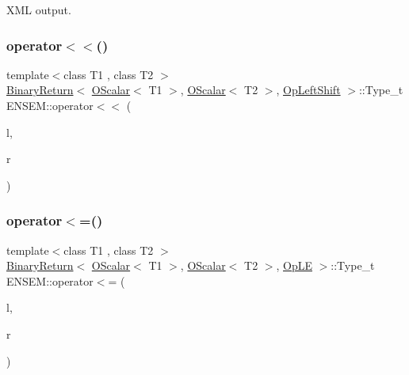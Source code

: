 X\+ML output. 

\mbox{\label{group__obsscalar_ga4e9caae1c3f8de5f5a7066462fdbd391}} 
\subsubsection{\texorpdfstring{operator$<$$<$()}{operator<<()}\hspace{0.1cm}{\footnotesize\ttfamily [4/4]}}
{\footnotesize\ttfamily template$<$class T1 , class T2 $>$ \\
\mbox{\hyperlink{structENSEM_1_1BinaryReturn}{Binary\+Return}}$<$ \mbox{\hyperlink{classENSEM_1_1OScalar}{O\+Scalar}}$<$ T1 $>$, \mbox{\hyperlink{classENSEM_1_1OScalar}{O\+Scalar}}$<$ T2 $>$, \mbox{\hyperlink{structENSEM_1_1OpLeftShift}{Op\+Left\+Shift}} $>$\+::Type\+\_\+t E\+N\+S\+E\+M\+::operator$<$$<$ (\begin{DoxyParamCaption}\item[{const \mbox{\hyperlink{classENSEM_1_1OScalar}{O\+Scalar}}$<$ T1 $>$ \&}]{l,  }\item[{const \mbox{\hyperlink{classENSEM_1_1OScalar}{O\+Scalar}}$<$ T2 $>$ \&}]{r }\end{DoxyParamCaption})\hspace{0.3cm}{\ttfamily [inline]}}

\mbox{\label{group__obsscalar_gaf2d22d4258136c38dba73b6d210b7048}} 
\subsubsection{\texorpdfstring{operator$<$=()}{operator<=()}}
{\footnotesize\ttfamily template$<$class T1 , class T2 $>$ \\
\mbox{\hyperlink{structENSEM_1_1BinaryReturn}{Binary\+Return}}$<$ \mbox{\hyperlink{classENSEM_1_1OScalar}{O\+Scalar}}$<$ T1 $>$, \mbox{\hyperlink{classENSEM_1_1OScalar}{O\+Scalar}}$<$ T2 $>$, \mbox{\hyperlink{structENSEM_1_1OpLE}{Op\+LE}} $>$\+::Type\+\_\+t E\+N\+S\+E\+M\+::operator$<$= (\begin{DoxyParamCaption}\item[{const \mbox{\hyperlink{classENSEM_1_1OScalar}{O\+Scalar}}$<$ T1 $>$ \&}]{l,  }\item[{const \mbox{\hyperlink{classENSEM_1_1OScalar}{O\+Scalar}}$<$ T2 $>$ \&}]{r }\end{DoxyParamCaption})\hspace{0.3cm}{\ttfamily [inline]}}

